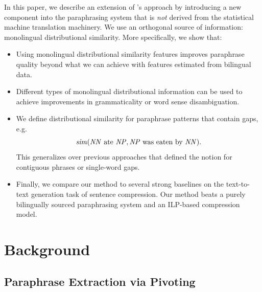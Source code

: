\documentclass[11pt]{article}
\begin{document}
In this paper, we describe an extension of
's approach by introducing a new component
into the paraphrasing system that is \emph{not} derived from the
statistical machine translation machinery. We use an orthogonal source
of information: monolingual distributional similarity. More
specifically, we show that:
\begin{itemize}
\item Using monolingual distributional similarity features improves
  paraphrase quality beyond what we can achieve with features estimated
  from bilingual data. 

\item Different types of monolingual distributional information can be
  used to achieve improvements in grammaticality or word sense
  disambiguation.

\item We define distributional similarity for paraphrase patterns that
  contain gaps, e.g.  \vspace{-6pt}
  \begin{equation*}\mathit{sim}(\mathit{NN}\text{ ate
    }\mathit{NP}, \mathit{NP}\text{ was eaten by }\mathit{NN} ).  \vspace{-2pt}
  \end{equation*} 
  This generalizes over previous approaches that defined the notion
  for contiguous phrases or single-word gaps.

\item Finally, we compare our method to several strong baselines on
  the text-to-text generation task of sentence compression. Our method
  beats a purely bilingually sourced paraphrasing system and an
  ILP-based compression model.
\end{itemize}

\section{Background}

\subsection{Paraphrase Extraction via Pivoting}
\label{sec-scfgs}
\end{document}
